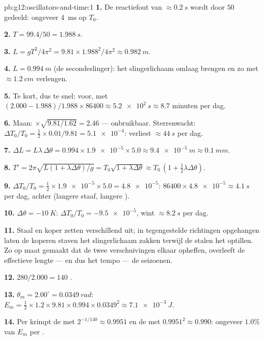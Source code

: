 \begin{solution}{pb:g12:oscillators-and-time:1}
\textbf{1.} De reactiefout van $\approx \qty{0.2}{s}$ wordt door $50$
gedeeld: ongeveer \qty{4}{ms} op $T_0$.

\textbf{2.} $T = 99.4/50 = \qty{1.988}{s}$.

\textbf{3.} $L = gT^2/4\pi^2 = 9.81 \times 1.988^2/4\pi^2 \approx
\qty{0.982}{m}$.

\textbf{4.} $L = \qty{0.994}{m}$ (de secondeslinger): het slingerlichaam
omlaag brengen en zo met $\approx \qty{1.2}{cm}$ verlengen.

\textbf{5.} Te kort, dus te snel: voor, met $(2.000 - 1.988)/1.988 \times
86400 \approx \qty{5.2e2}{s} \approx 8.7$ minuten per dag.

\textbf{6.} Maan: $\times\sqrt{9.81/1.62} = 2.46$ --- onbruikbaar.
Sterrenwacht: $\Delta T_0/T_0 = \tfrac12 \times 0.01/9.81 = \num{5.1e-4}$:
verliest $\approx \qty{44}{s}$ per dag.

\textbf{7.} $\Delta L = L\lambda\,\Delta\theta = 0.994 \times
\num{1.9e-5} \times 5.0 \approx \qty{9.4e-5}{m} \approx \qty{0.1}{mm}$.

\textbf{8.} $T' = 2\pi\sqrt{L(1 + \lambda\Delta\theta)/g} =
T_0\sqrt{1 + \lambda\Delta\theta} \approx T_0\,(1 + \tfrac12
\lambda\Delta\theta)$.

\textbf{9.} $\Delta T_0/T_0 = \tfrac12 \times \num{1.9e-5} \times 5.0 =
\num{4.8e-5}$: $86400 \times \num{4.8e-5} \approx \qty{4.1}{s}$ per dag,
achter (langere staaf, langere ).

\textbf{10.} $\Delta\theta = \qty{-10}{K}$: $\Delta T_0/T_0 = \num{-9.5e-5}$,
wint $\approx \qty{8.2}{s}$ per dag.

\textbf{11.} Staal en koper zetten verschillend uit; in tegengestelde
richtingen opgehangen laten de koperen staven het slingerlichaam zakken
terwijl de stalen het optillen. Zo op maat gemaakt dat de twee
verschuivingen elkaar opheffen, overleeft de effectieve lengte --- en dus het
tempo --- de seizoenen.

\textbf{12.} $280/2.000 = 140$ .

\textbf{13.} $\theta_m = 2.00^\circ = \qty{0.0349}{rad}$: $E_m =
\tfrac12 \times 1.2 \times 9.81 \times 0.994 \times 0.0349^2 \approx
\qty{7.1e-3}{J}$.

\textbf{14.} Per  krimpt de  met $2^{-1/140} \approx
0.9951$ en de  met $0.9951^2 \approx 0.990$: ongeveer $1.0\%$ van
$E_m$ per .


\end{solution}
